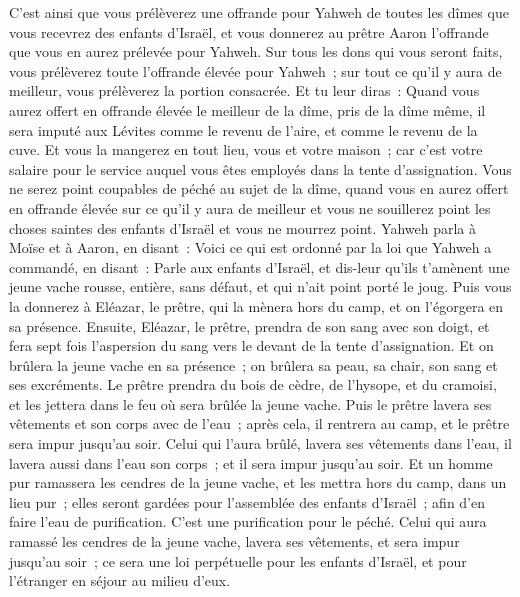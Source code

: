 \begin{multicols}{2}
C'est ainsi que vous prélèverez une offrande pour Yahweh de toutes les dîmes que vous recevrez des enfants d'Israël, et vous donnerez au prêtre Aaron l'offrande que vous en aurez prélevée pour Yahweh.
Sur tous les dons qui vous seront faits, vous prélèverez toute l'offrande élevée pour Yahweh~; sur tout ce qu'il y aura de meilleur, vous prélèverez la portion consacrée.
Et tu leur diras~: Quand vous aurez offert en offrande élevée le meilleur de la dîme, pris de la dîme même, il sera imputé aux Lévites comme le revenu de l'aire, et comme le revenu de la cuve.
Et vous la mangerez en tout lieu, vous et votre maison~; car c'est votre salaire pour le service auquel vous êtes employés dans la tente d'assignation.
Vous ne serez point coupables de péché au sujet de la dîme, quand vous en aurez offert en offrande élevée sur ce qu'il y aura de meilleur et vous ne souillerez point les choses saintes des enfants d'Israël et vous ne mourrez point.
\VerseOne{}Yahweh parla à Moïse et à Aaron, en disant~:
Voici ce qui est ordonné par la loi que Yahweh a commandé, en disant~: Parle aux enfants d'Israël, et dis-leur qu'ils t'amènent une jeune vache rousse, entière, sans défaut, et qui n'ait point porté le joug.
Puis vous la donnerez à Eléazar, le prêtre, qui la mènera hors du camp, et on l'égorgera en sa présence.
Ensuite, Eléazar, le prêtre, prendra de son sang avec son doigt, et fera sept fois l'aspersion du sang vers le devant de la tente d'assignation.
Et on brûlera la jeune vache en sa présence~; on brûlera sa peau, sa chair, son sang et ses excréments.
Le prêtre prendra du bois de cèdre, de l'hysope, et du cramoisi, et les jettera dans le feu où sera brûlée la jeune vache.
Puis le prêtre lavera ses vêtements et son corps avec de l'eau~; après cela, il rentrera au camp, et le prêtre sera impur jusqu'au soir.
Celui qui l'aura brûlé, lavera ses vêtements dans l'eau, il lavera aussi dans l'eau son corps~; et il sera impur jusqu'au soir.
Et un homme pur ramassera les cendres de la jeune vache, et les mettra hors du camp, dans un lieu pur~; elles seront gardées pour l'assemblée des enfants d'Israël~; afin d'en faire l'eau de purification. C'est une purification pour le péché.
Celui qui aura ramassé les cendres de la jeune vache, lavera ses vêtements, et sera impur jusqu'au soir~; ce sera une loi perpétuelle pour les enfants d'Israël, et pour l'étranger en séjour au milieu d'eux.

\end{multicols}
